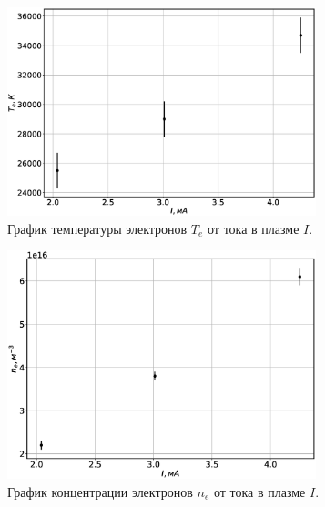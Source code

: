 \documentclass[12pt]{article}
\begin{document}
\begin{figure}[H]
	\centering
	\includegraphics[width=0.8\textwidth]{TeI.eps}
	\caption{График температуры электронов $T_e$ от тока в плазме $I$.}
	\label{fig:TeI}
\end{figure}

\begin{figure}[H]
	\centering
	\includegraphics[width=0.8\textwidth]{neI.eps}
	\caption{График концентрации электронов $n_e$ от тока в плазме $I$.}
	\label{fig:neI}
\end{figure}
\end{document}
